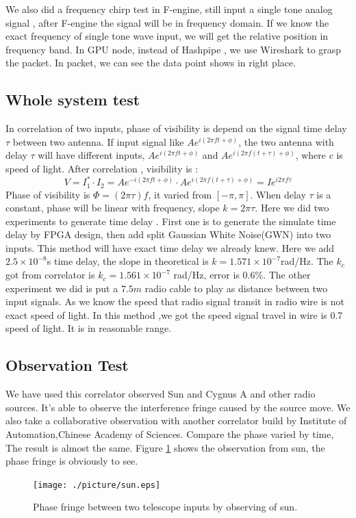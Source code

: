 \documentclass{ws-jai}
\begin{document}
We also did a frequency chirp test in F-engine, still input a single tone analog signal , after F-engine the signal will be in frequency domain. If we know the exact frequency of single tone wave input, we will get the relative position in frequency band. In GPU node, instead of Hashpipe , we use Wireshark to grasp the packet. In packet, we can see the data point shows in right place.
\subsection{Whole system test}
In correlation of two inputs, phase of visibility is depend on the signal time delay $\tau$ between two antenna. If input signal like $Ae^{i(2\pi ft + \phi)}$,  the two antenna with delay $\tau$ will have different inputs,  $Ae^{i(2\pi ft + \phi)}$ and  $Ae^{i(2\pi f(t+\tau) + \phi)}$, where $c$ is speed of light. After correlation , visibility is :
\begin{equation}
V = I_1^*\cdot I_2=Ae^{-i(2\pi ft + \phi)} \cdot Ae^{i(2\pi f(t+\tau) + \phi)} = I e^{i2\pi f\tau}
\end{equation}
Phase of visibility is $\Phi =(2\pi \tau )f$, it varied from $[-\pi, \pi]$.  When delay $\tau$ is a constant, phase will be linear with frequency, slope $k =2\pi \tau $. Here we did two experiments to generate time delay .  First one is to generate the simulate time delay by FPGA design, then add split Gaussian White Noise(GWN) into two inputs. This method will have exact time delay we already knew. Here we add $2.5\times 10^{-8}$s time delay, the slope in theoretical is $k=1.571\times 10^{-7}$rad/Hz. The $k_c$ got from correlator is $k_c = 1.561 \times 10^{-7}$ rad/Hz, error is $0.6\%$.
The other experiment we did is put a $7.5m$ radio cable to play as distance between two input signals.  As we know the speed that radio signal transit in radio wire is not exact speed of light. In this method ,we got the speed signal travel in wire is 0.7 speed of light. It is in reasonable range.
\subsection{Observation Test}
We have used this correlator observed Sun and Cygnus A and other radio sources. It's able to observe the interference fringe caused by the source move. We also take a collaborative observation with another correlator build by Institute of Automation,Chinese Academy of Sciences. Compare the phase varied by time, The result is almost the same. Figure \ref{fig:sun} shows the observation from sun, the phase fringe is obviously to see.
\begin{figure}[t]
 \centering
 \texttt{[image: ./picture/sun.eps]}
\caption{Phase fringe between two telescope inputs by observing of sun.\label{fig:sun}}
\end{figure}
\end{document}
